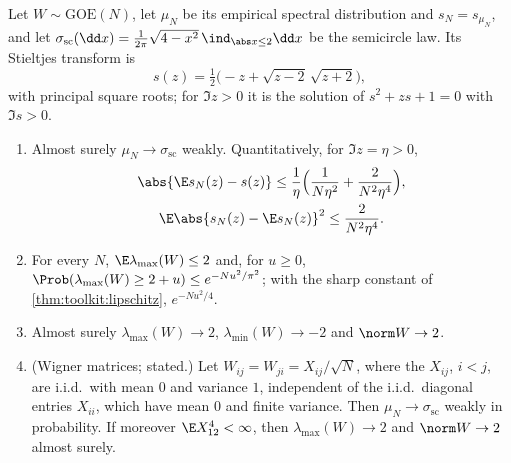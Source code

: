 \begin{refsection}
\begin{theorem}\label{thm:toolkit:semicircle}
Let $W\sim\mathrm{GOE}(N)$, let $\mu_N$ be its empirical spectral distribution and $s_N=s_{\mu_N}$, and let $\sigma_{\mathrm{sc}}(\dd x)=\frac1{2\pi}\sqrt{4-x^2}\,\ind_{\abs x\le2}\dd x$ be the semicircle law. Its Stieltjes transform is
\begin{equation}\label{eq:toolkit:ssc}
s(z)=\tfrac12\bigl(-z+\sqrt{z-2}\,\sqrt{z+2}\bigr),
\end{equation}
with principal square roots; for $\Im z>0$ it is the solution of $s^2+zs+1=0$ with $\Im s>0$.
\begin{enumerate}
\item Almost surely $\mu_N\to\sigma_{\mathrm{sc}}$ weakly. Quantitatively, for $\Im z=\eta>0$,
\begin{gather*}
\abs{\E s_N(z)-s(z)}\le\frac1\eta\Bigl(\frac1{N\eta^2}+\frac2{N^2\eta^4}\Bigr),\\
\E\abs{s_N(z)-\E s_N(z)}^2\le\frac2{N^2\eta^4}.
\end{gather*}
\item For every $N$, $\E\lambda_{\max}(W)\le2$ and, for $u\ge0$, $\Prob(\lambda_{\max}(W)\ge2+u)\le e^{-Nu^2/\pi^2}$; with the sharp constant of \cref{thm:toolkit:lipschitz}, $e^{-Nu^2/4}$.
\item Almost surely $\lambda_{\max}(W)\to2$, $\lambda_{\min}(W)\to-2$ and $\norm W\to2$.
\item (Wigner matrices; stated.) Let $W_{ij}=W_{ji}=X_{ij}/\sqrt N$, where the $X_{ij}$, $i<j$, are i.i.d.\ with mean $0$ and variance $1$, independent of the i.i.d.\ diagonal entries $X_{ii}$, which have mean $0$ and finite variance. Then $\mu_N\to\sigma_{\mathrm{sc}}$ weakly in probability. If moreover $\E X_{12}^4<\infty$, then $\lambda_{\max}(W)\to2$ and $\norm W\to2$ almost surely.
\end{enumerate}
\end{theorem}


\end{refsection}
